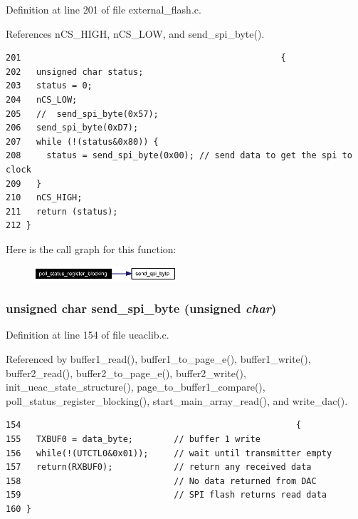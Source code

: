 Definition at line 201 of file external\_\-flash.c.

References n\-CS\_\-HIGH, n\-CS\_\-LOW, and send\_\-spi\_\-byte().

\footnotesize\begin{verbatim}201                                                   {  
202   unsigned char status;
203   status = 0;
204   nCS_LOW;  
205   //  send_spi_byte(0x57);
206   send_spi_byte(0xD7);
207   while (!(status&0x80)) { 
208     status = send_spi_byte(0x00); // send data to get the spi to clock
209   }
210   nCS_HIGH;
211   return (status); 
212 }
\end{verbatim}\normalsize 




Here is the call graph for this function:\begin{figure}[H]
\begin{center}
\leavevmode
\includegraphics[width=150pt]{external__flash_8h_a12_cgraph}
\end{center}
\end{figure}
\subsubsection{\setlength{\rightskip}{0pt plus 5cm}unsigned char send\_\-spi\_\-byte (unsigned {\em char})}\label{external__flash_8h_a5}




Definition at line 154 of file ueaclib.c.

Referenced by buffer1\_\-read(), buffer1\_\-to\_\-page\_\-e(), buffer1\_\-write(), buffer2\_\-read(), buffer2\_\-to\_\-page\_\-e(), buffer2\_\-write(), init\_\-ueac\_\-state\_\-structure(), page\_\-to\_\-buffer1\_\-compare(), poll\_\-status\_\-register\_\-blocking(), start\_\-main\_\-array\_\-read(), and write\_\-dac().

\footnotesize\begin{verbatim}154                                                      {
155   TXBUF0 = data_byte;        // buffer 1 write  
156   while(!(UTCTL0&0x01));     // wait until transmitter empty
157   return(RXBUF0);            // return any received data
158                              // No data returned from DAC
159                              // SPI flash returns read data
160 }
\end{verbatim}\normalsize 


